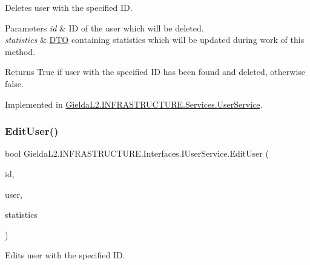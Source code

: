Deletes user with the specified ID. 


\begin{DoxyParams}{Parameters}
{\em id} & ID of the user which will be deleted.\\
\hline
{\em statistics} & \mbox{\hyperlink{namespace_gielda_l2_1_1_i_n_f_r_a_s_t_r_u_c_t_u_r_e_1_1_d_t_o}{D\+TO}} containing statistics which will be updated during work of this method.\\
\hline
\end{DoxyParams}
\begin{DoxyReturn}{Returns}
True if user with the specified ID has been found and deleted, otherwise false.
\end{DoxyReturn}


Implemented in \mbox{\hyperlink{class_gielda_l2_1_1_i_n_f_r_a_s_t_r_u_c_t_u_r_e_1_1_services_1_1_user_service_ae318cd1c42a95c89d736e3dc1151dddc}{Gielda\+L2.\+I\+N\+F\+R\+A\+S\+T\+R\+U\+C\+T\+U\+R\+E.\+Services.\+User\+Service}}.

\mbox{\label{interface_gielda_l2_1_1_i_n_f_r_a_s_t_r_u_c_t_u_r_e_1_1_interfaces_1_1_i_user_service_ab4f5c1c2ac78ee462e0a488b7f2ea50e}} 
\subsubsection{\texorpdfstring{EditUser()}{EditUser()}}
{\footnotesize\ttfamily bool Gielda\+L2.\+I\+N\+F\+R\+A\+S\+T\+R\+U\+C\+T\+U\+R\+E.\+Interfaces.\+I\+User\+Service.\+Edit\+User (\begin{DoxyParamCaption}\item[{int}]{id,  }\item[{\mbox{\hyperlink{class_gielda_l2_1_1_i_n_f_r_a_s_t_r_u_c_t_u_r_e_1_1_d_t_o_1_1_user_d_t_o}{User\+D\+TO}}}]{user,  }\item[{\mbox{\hyperlink{class_gielda_l2_1_1_i_n_f_r_a_s_t_r_u_c_t_u_r_e_1_1_d_t_o_1_1_statistics_d_t_o}{Statistics\+D\+TO}}}]{statistics }\end{DoxyParamCaption})}



Edits user with the specified ID. 


